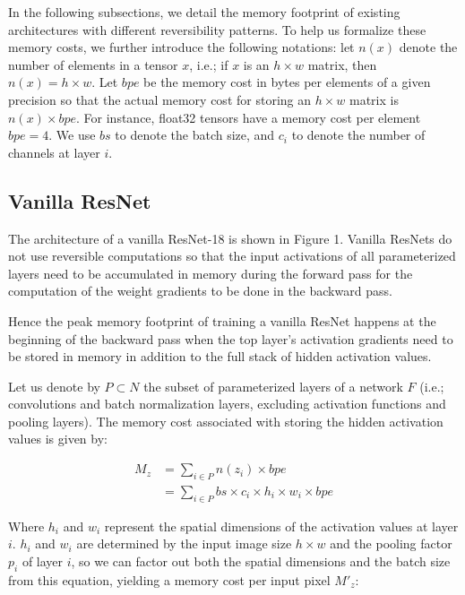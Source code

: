 \documentclass[twocolumn]{bmcart}
\begin{document}
In the following subsections, we detail the memory footprint of existing architectures with different reversibility patterns.
To help us formalize these memory costs, we further introduce the following notations: 
let $n(x)$ denote the number of elements in a tensor $x$, i.e.; if $x$ is an $h \times w$ matrix, then $n(x)=h \times w$. 
Let $bpe$ be the memory cost in bytes per elements of a given precision so that the actual memory cost for storing an $h \times w$ matrix is $n(x) \times bpe$. 
For instance, float32 tensors have a memory cost per element $bpe=4$. 
We use $bs$ to denote the batch size, and $c_i$ to denote the number of channels at layer $i$.

\subsection{Vanilla ResNet}

The architecture of a vanilla ResNet-18 is shown in Figure 1.
Vanilla ResNets do not use reversible computations so that the input activations of all parameterized layers need to be accumulated in memory during the forward pass for the computation of the weight gradients to be done in the backward pass.

Hence the peak memory footprint of training a vanilla ResNet happens at the beginning of the backward pass when the top layer's activation gradients need to be stored in memory in addition to the full stack of hidden activation values.

Let us denote by $P \subset N$ the subset of parameterized layers of a network $F$ 
(i.e.; convolutions and batch normalization layers, excluding activation functions and pooling layers). 
The memory cost associated with storing the hidden activation values is given by: 

\begin{subequations}
\begin{align}
M_{z} &= \sum_{i \in P} n(z_i) \times bpe \\
      &= \sum_{i \in P} bs \times c_i \times h_i \times w_i \times bpe 
\end{align}
\end{subequations}

Where $h_i$ and $w_i$ represent the spatial dimensions of the activation values at layer $i$.
$h_i$ and $w_i$ are determined by the input image size $h \times w$ and the pooling factor $p_i$ of layer $i$, so we can factor out both the spatial dimensions and the batch size from this equation, yielding a memory cost per input pixel $M'_z$:
\end{document}

